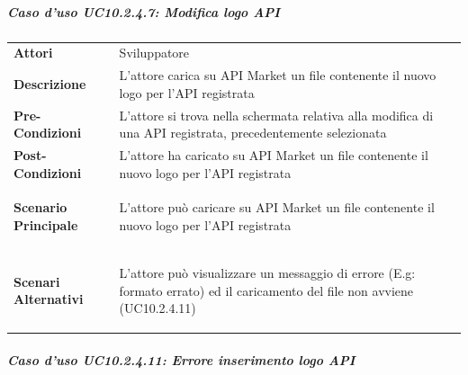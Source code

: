 \subparagraph{Caso d'uso UC10.2.4.7: Modifica logo API}
\label{UC10_2_4_7}

\begin{minipage}{\linewidth}
	\begin{tabular}{ l | p{11cm}}
		\hline
		\rowcolor{Gray}
		\multicolumn{2}{c}{10.2.4.7 - Modifica logo API} \\
		\hline
		\textbf{Attori} & Sviluppatore \\
		\textbf{Descrizione} & L'attore carica su API Market un file contenente il nuovo logo per l'API registrata \\
		\textbf{Pre-Condizioni} & L'attore si trova nella schermata relativa alla modifica di una API registrata, precedentemente selezionata \\
		\textbf{Post-Condizioni} & L'attore ha caricato su API Market un file contenente il nuovo logo per l'API registrata \\
		\textbf{Scenario Principale} & 
		\begin{enumerate*}[label=(\arabic*.),itemjoin={\newline}]
			\item L'attore può caricare su API Market un file contenente il nuovo logo per l'API registrata
		\end{enumerate*}\\
		\textbf{Scenari Alternativi} & 
		\begin{enumerate*}[label=(\arabic*.),itemjoin={\newline}]
		\item L'attore può visualizzare un messaggio di errore (E.g: formato errato) ed il caricamento del file non avviene (UC10.2.4.11)
		\end{enumerate*}\\
	\end{tabular}
\end{minipage}

\subparagraph{Caso d'uso UC10.2.4.11: Errore inserimento logo API}
\label{UC10_2_4_11}

